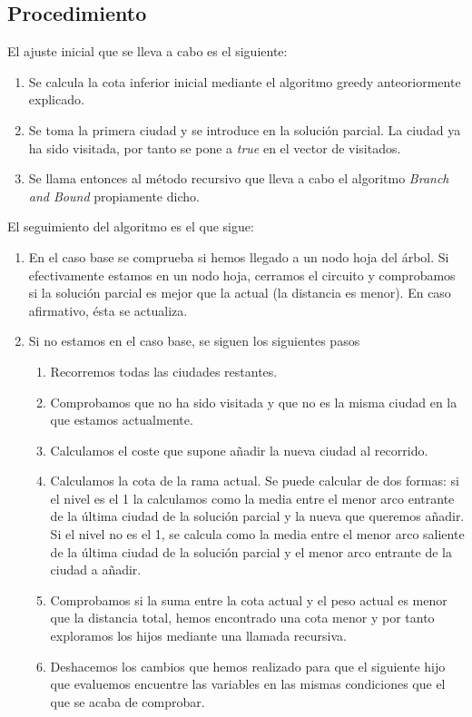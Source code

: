 \documentclass[12pt,spanish]{article}
\begin{document}
\subsection{Procedimiento}

El ajuste inicial que se lleva a cabo es el siguiente:

\begin{enumerate}
	\item Se calcula la cota inferior inicial mediante el algoritmo greedy anteoriormente explicado.
	\item Se toma la primera ciudad y se introduce en la solución parcial. La ciudad ya ha sido visitada, por tanto se pone a \textit{true} en el vector de visitados.
	\item Se llama entonces al método recursivo que lleva a cabo el algoritmo \textit{Branch and Bound} propiamente dicho.

\end{enumerate}

El seguimiento del algoritmo es el que sigue:

\begin{enumerate}
	\item En el caso base se comprueba si hemos llegado a un nodo hoja del árbol. Si efectivamente estamos en un nodo hoja, cerramos el circuito y comprobamos si la solución parcial es mejor que la actual (la distancia es menor). En caso afirmativo, ésta se actualiza.
	\item Si no estamos en el caso base, se siguen los siguientes pasos
	\begin{enumerate}
		\item Recorremos todas las ciudades restantes.
		\item Comprobamos que no ha sido visitada y que no es la misma ciudad en la que estamos actualmente.
		\item Calculamos el coste que supone añadir la nueva ciudad al recorrido.
		\item Calculamos la cota de la rama actual. Se puede calcular de dos formas: si el nivel es el 1 la calculamos como la media entre el menor arco entrante de la última ciudad de la solución parcial y la nueva que queremos añadir. Si el nivel no es el 1, se calcula como la media entre el menor arco saliente de la última ciudad de la solución parcial y el menor arco entrante de la ciudad a añadir.
		\item Comprobamos si la suma entre la cota actual y el peso actual es menor que la distancia total, hemos encontrado una cota menor y por tanto exploramos los hijos mediante una llamada recursiva.
		\item Deshacemos los cambios que hemos realizado para que el siguiente hijo que evaluemos encuentre las variables en las mismas condiciones que el que se acaba de comprobar.
	\end{enumerate}
\end{enumerate}
\end{document}
